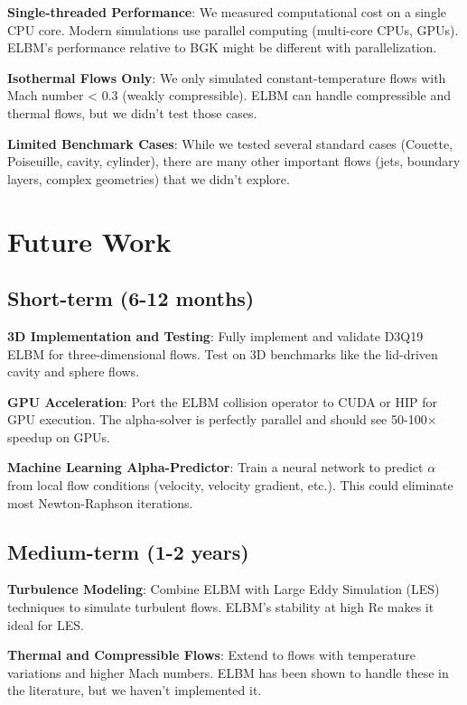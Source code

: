 \textbf{Single-threaded Performance}: We measured computational cost on a single CPU core. Modern simulations use parallel computing (multi-core CPUs, GPUs). ELBM's performance relative to BGK might be different with parallelization.

\textbf{Isothermal Flows Only}: We only simulated constant-temperature flows with Mach number < 0.3 (weakly compressible). ELBM can handle compressible and thermal flows, but we didn't test those cases.

\textbf{Limited Benchmark Cases}: While we tested several standard cases (Couette, Poiseuille, cavity, cylinder), there are many other important flows (jets, boundary layers, complex geometries) that we didn't explore.

\section{Future Work}

\subsection{Short-term (6-12 months)}

\textbf{3D Implementation and Testing}: Fully implement and validate D3Q19 ELBM for three-dimensional flows. Test on 3D benchmarks like the lid-driven cavity and sphere flows.

\textbf{GPU Acceleration}: Port the ELBM collision operator to CUDA or HIP for GPU execution. The alpha-solver is perfectly parallel and should see 50-100× speedup on GPUs.

\textbf{Machine Learning Alpha-Predictor}: Train a neural network to predict $\alpha$ from local flow conditions (velocity, velocity gradient, etc.). This could eliminate most Newton-Raphson iterations.

\subsection{Medium-term (1-2 years)}

\textbf{Turbulence Modeling}: Combine ELBM with Large Eddy Simulation (LES) techniques to simulate turbulent flows. ELBM's stability at high Re makes it ideal for LES.

\textbf{Thermal and Compressible Flows}: Extend to flows with temperature variations and higher Mach numbers. ELBM has been shown to handle these in the literature, but we haven't implemented it.

